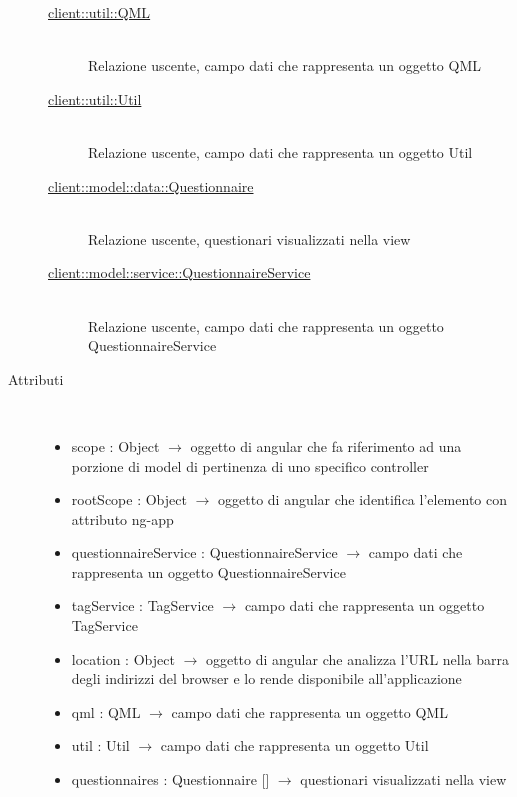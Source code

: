 \begin{description}
\begin{description}
	\item[\hyperlink{client::util::QML}{client::util::QML}] \hfill \\
	Relazione uscente, campo dati che rappresenta un oggetto QML
	\item[\hyperlink{client::util::Util}{client::util::Util}] \hfill \\
	Relazione uscente, campo dati che rappresenta un oggetto Util
	\item[\hyperlink{client::model::data::Questionnaire}{client::model::data::Questionnaire}] \hfill \\
	Relazione uscente, questionari visualizzati nella view
	\item[\hyperlink{client::model::service::QuestionnaireService}{client::model::service::QuestionnaireService}] \hfill \\
	Relazione uscente, campo dati che rappresenta un oggetto QuestionnaireService
\end{description}

\item[Attributi] \hfill \\
\vspace{-7mm}
\begin{itemize}
	\item scope : Object $\rightarrow$ oggetto di angular che fa riferimento ad una porzione di model di pertinenza di uno specifico controller
	\item rootScope : Object $\rightarrow$ oggetto di angular che identifica l’elemento con attributo ng-app
	\item questionnaireService : QuestionnaireService $\rightarrow$ campo dati che rappresenta un oggetto QuestionnaireService
	\item tagService : TagService $\rightarrow$ campo dati che rappresenta un oggetto TagService
	\item location : Object $\rightarrow$ oggetto di angular che analizza l'URL nella barra degli indirizzi del browser e lo rende disponibile all'applicazione
	\item qml : QML $\rightarrow$ campo dati che rappresenta un oggetto QML
	\item util : Util $\rightarrow$ campo dati che rappresenta un oggetto Util
	\item questionnaires : Questionnaire [] $\rightarrow$ questionari visualizzati nella view
\end{itemize}


\end{description}
